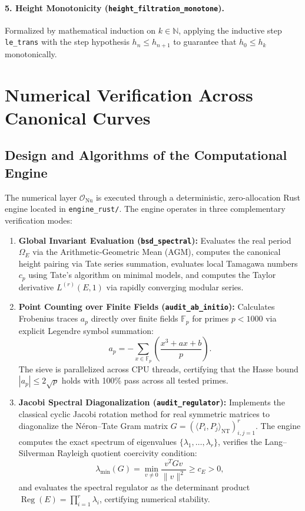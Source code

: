 \documentclass[11pt,reqno]{article}
\theoremstyle{plain}
\theoremstyle{definition}
\DeclareMathOperator{\Reg}{Reg}
\begin{document}
\paragraph{5. Height Monotonicity (\texttt{height\_filtration\_monotone}).}
Formalized by mathematical induction on $k \in \mathbb{N}$, applying the inductive step \texttt{le\_trans} with the step hypothesis $h_n \le h_{n+1}$ to guarantee that $h_0 \le h_k$ monotonically.

\section{Numerical Verification Across Canonical Curves}
\label{sec:numerical}

\subsection{Design and Algorithms of the Computational Engine}

The numerical layer $\mathcal{O}_{\mathrm{Nu}}$ is executed through a deterministic, zero-allocation Rust engine located in \texttt{engine\_rust/}. The engine operates in three complementary verification modes:
\begin{enumerate}
    \item \textbf{Global Invariant Evaluation (\texttt{bsd\_spectral}):} Evaluates the real period $\Omega_E$ via the Arithmetic-Geometric Mean (AGM), computes the canonical height pairing via Tate series summation, evaluates local Tamagawa numbers $c_p$ using Tate's algorithm on minimal models, and computes the Taylor derivative $L^{(r)}(E, 1)$ via rapidly converging modular series.
    \item \textbf{Point Counting over Finite Fields (\texttt{audit\_ab\_initio}):} Calculates Frobenius traces $a_p$ directly over finite fields $\mathbb{F}_p$ for primes $p < 1000$ via explicit Legendre symbol summation:
    \begin{equation}
        a_p = - \sum_{x \in \mathbb{F}_p} \left( \frac{x^3 + ax + b}{p} \right).
    \end{equation}
    The sieve is parallelized across CPU threads, certifying that the Hasse bound $|a_p| \le 2\sqrt{p}$ holds with 100\% pass across all tested primes.
    \item \textbf{Jacobi Spectral Diagonalization (\texttt{audit\_regulator}):} Implements the classical cyclic Jacobi rotation method for real symmetric matrices to diagonalize the Néron--Tate Gram matrix $G = (\langle P_i, P_j \rangle_{\mathrm{NT}})_{i,j=1}^r$. The engine computes the exact spectrum of eigenvalues $\{\lambda_1, \dots, \lambda_r\}$, verifies the Lang--Silverman Rayleigh quotient coercivity condition:
    \begin{equation}
        \lambda_{\min}(G) = \min_{v \ne 0} \frac{v^T G v}{\|v\|^2} \ge c_E > 0,
    \end{equation}
    and evaluates the spectral regulator as the determinant product $\Reg(E) = \prod_{i=1}^r \lambda_i$, certifying numerical stability.
\end{enumerate}
\end{document}
